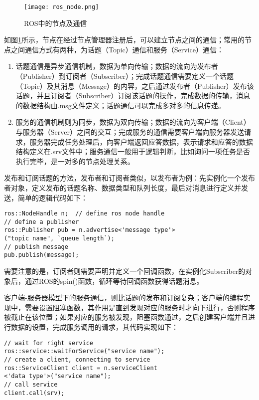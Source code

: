 \begin{figure}[!ht]
\centering
\texttt{[image: ros\_node.png]}
\caption{ROS中的节点及通信} 
\label{fig2}
\end{figure}

如图\ref{fig2}所示，节点在经过节点管理器注册后，可以建立节点之间的通信；常用的节点之间通信方式有两种，为话题（Topic）通信和服务（Service）通信：
\begin{enumerate}
	\item 话题通信是异步通信机制，数据为单向传输；数据的流向为发布者（Publisher）到订阅者（Subscriber）；完成话题通信需要定义一个话题（Topic）及其消息（Message）的内容，之后通过发布者（Publisher）发布该话题，并且订阅者（Subscriber）订阅该话题的操作，完成数据的传输，消息的数据结构由.msg文件定义；话题通信可以完成多对多的信息传递。
	\item 
	服务的通信机制则为同步，数据为双向传输；数据的流向为客户端（Client）与服务器（Server）之间的交互；完成服务的通信需要客户端向服务器发送请求，服务器完成任务处理后，向客户端返回应答数据，表示请求和应答的数据结构定义在.srv文件中；服务通信一般用于逻辑判断，比如询问一项任务是否执行完毕，是一对多的节点处理关系。
\end{enumerate}

发布和订阅话题的方法，发布者和订阅者类似，以发布者为例：先实例化一个发布者对象，定义发布的话题名称、数据类型和队列长度，最后对消息进行定义并发送，简单的逻辑代码如下：

\begin{verbatim}
ros::NodeHandle n;  // define ros node handle
// define a publisher
ros::Publisher pub = n.advertise<'message type'>
("topic name", `queue length`);
// publish message
pub.publish(message);
\end{verbatim}

需要注意的是，订阅者则需要声明并定义一个回调函数，在实例化Subscriber的对象后，通过ROS的spin()函数，循环等待回调函数获得话题消息。

客户端-服务器模型下的服务通信，则比话题的发布和订阅复杂；客户端的编程实现中，需要设置阻塞函数，其作用是直到发现对应的服务时才向下进行，否则程序被截止在该位置；如果对应的服务被发现，阻塞函数通过，之后创建客户端并且进行数据的设置，完成服务调用的请求，其代码实现如下：

\begin{verbatim}
// wait for right service
ros::service::waitForService("service name");
// create a client, connecting to service
ros::ServiceClient client = n.serviceClient
<'data type'>("service name");
// call service
client.call(srv);
\end{verbatim}

